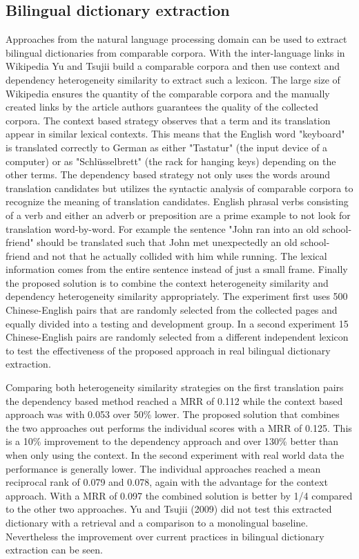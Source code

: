 \documentclass[journal]{IEEEtran}
\begin{document}
\subsection{Bilingual dictionary extraction}
Approaches from the natural language processing domain can be used to extract bilingual dictionaries from comparable corpora.
With the inter-language links in Wikipedia Yu and Tsujii \cite{yu09} build a comparable corpora and then use context and dependency heterogeneity similarity to extract such a lexicon.
The large size of Wikipedia ensures the quantity of the comparable corpora and the manually created links by the article authors guarantees the quality of the collected corpora.
The context based strategy observes that a term and its translation appear in similar lexical contexts.
This means that the English word "keyboard" is translated correctly to German as either "Tastatur" (the input device of a computer) or as "Schl\"usselbrett" (the rack for hanging keys) depending on the other terms.
The dependency based strategy not only uses the words around translation candidates but utilizes the syntactic analysis of comparable corpora to recognize the meaning of translation candidates.
English phrasal verbs consisting of a verb and either an adverb or preposition are a prime example to not look for translation word-by-word.
For example the sentence "John ran into an old school-friend" should be translated such that John met unexpectedly an old school-friend and not that he actually collided with him while running.
The lexical information comes from the entire sentence instead of just a small frame.
Finally the proposed solution is to combine the context heterogeneity similarity and dependency heterogeneity similarity appropriately.
The experiment first uses 500 Chinese-English pairs that are randomly selected from the collected pages and equally divided into a testing and development group.
In a second experiment 15 Chinese-English pairs are randomly selected from a different independent lexicon to test the effectiveness of the proposed approach in real bilingual dictionary extraction.

Comparing both heterogeneity similarity strategies on the first translation pairs the dependency based method reached a MRR of 0.112 while the context based approach was with 0.053 over 50\% lower.
The proposed solution that combines the two approaches out performs the individual scores with a MRR of 0.125.
This is a 10\% improvement to the dependency approach and over 130\% better than when only using the context.
In the second experiment with real world data the performance is generally lower.
The individual approaches reached a mean reciprocal rank of 0.079 and 0.078, again with the advantage for the context approach.
With a MRR of 0.097 the combined solution is better by 1/4 compared to the other two approaches.
Yu and Tsujii (2009) did not test this extracted dictionary with a retrieval and a comparison to a monolingual baseline.
Nevertheless the improvement over current practices in bilingual dictionary extraction can be seen.
\end{document}
